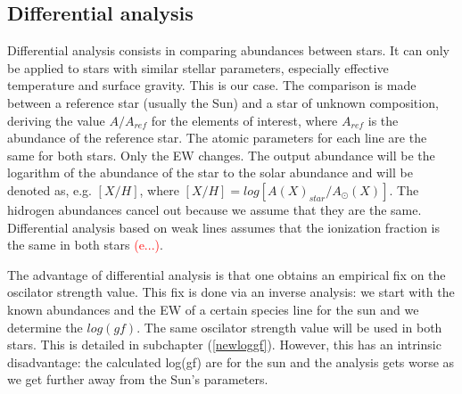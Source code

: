 \documentclass[dvips,12pt,a4paper]{report}
\begin{document}
{%






\subsection {Differential analysis}
\label {difanal}


Differential analysis consists in comparing abundances between stars. It can only be applied to stars with similar stellar parameters, especially effective temperature and surface gravity. This is our case.  The comparison is made between a reference star (usually the Sun) and a star of unknown composition, deriving the value $A/A_{ref}$ for the elements of interest, where $A_{ref}$ is the abundance of the reference star. The atomic parameters for each line are the same for both stars. Only the EW changes. The output abundance will be the logarithm of the abundance of the star to the solar abundance and will be denoted as, e.g. $[X/H]$, where $[X/H]=log[A(X)_{star}/A_\odot(X)]$. The hidrogen abundances cancel out because we assume that they are the same. Differential analysis based on weak lines assumes that the ionization fraction is the same in both stars \textcolor{red}{(e...)}. 

The advantage of differential analysis is that one obtains an empirical fix on the oscilator strength value. This fix is done via an inverse analysis: we start with the known abundances and the EW of a certain species line for the sun and we determine the $log(gf)$. The same oscilator strength value will be used in both stars. This is detailed in subchapter (\ref{newloggf}). However, this has an intrinsic disadvantage: the calculated log(gf) are for the sun and the analysis gets worse as we get further away from the Sun's parameters. 

}
\end{document}
